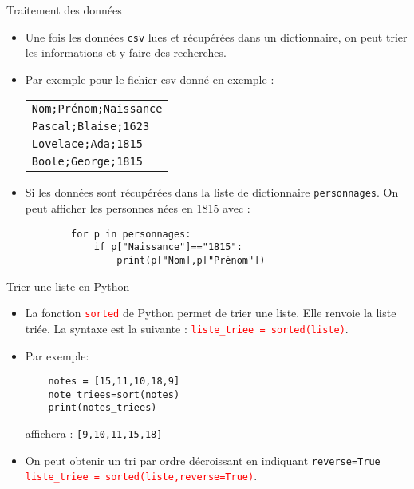 \documentclass[10pt]{beamer}
\begin{document}
\begin{frame}[fragile]
	\mframe{\DB}
	\begin{block}{Traitement des données}
		\begin{itemize}
			\item<1-> Une fois les données {\tt csv} lues et récupérées dans un dictionnaire, on peut trier les informations et y faire des recherches.
			\item<2-> Par exemple pour le fichier csv donné en exemple :
			      \begin{tabular}{|l|}
				      \hline
				      {\tt Nom;Prénom;Naissance} \\
				      {\tt Pascal;Blaise;1623}   \\
				      {\tt Lovelace;Ada;1815}    \\
				      {\tt Boole;George;1815}    \\
				      \hline
			      \end{tabular}
			\item<3-> Si les données sont récupérées dans la liste de dictionnaire {\tt personnages}. On peut afficher les personnes nées en 1815 avec :
			      \begin{lstlisting}
    	for p in personnages:
    		if p["Naissance"]=="1815":
    			print(p["Nom],p["Prénom"])
    \end{lstlisting}
		\end{itemize}
	\end{block}
\end{frame}

\begin{frame}[fragile]
	\mframe{\DB}
	\begin{alertblock}{Trier une liste en Python}
		\begin{itemize}
			\item<1-> La fonction \textcolor{red}{\tt sorted} de Python permet de trier une liste. Elle renvoie la liste triée. La syntaxe est la suivante : \textcolor{red}{\tt liste\_triee = sorted(liste)}.
			\item<2-> Par exemple:
			      \begin{lstlisting}
	notes = [15,11,10,18,9]
	note_triees=sort(notes)
	print(notes_triees)
	 \end{lstlisting}
			      affichera : {\tt [9,10,11,15,18]}
			\item<3-> On peut obtenir un tri par ordre décroissant en indiquant {\tt reverse=True} \textcolor{red}{\tt liste\_triee = sorted(liste,reverse=True)}.
		\end{itemize}
	\end{alertblock}
\end{frame}
\end{document}
